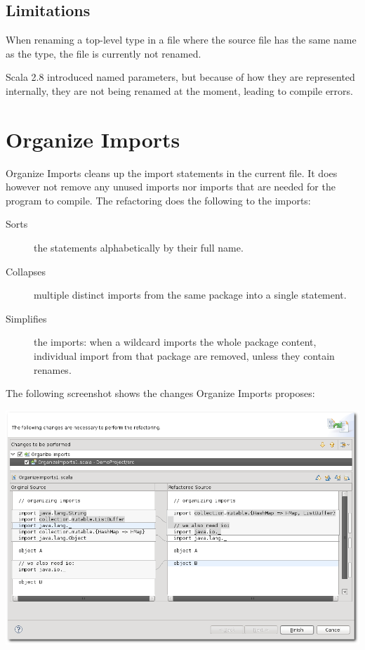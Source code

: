 \documentclass[10pt,a4paper,oneside]{scrreprt}
\begin{document}
\subsection{Limitations}

When renaming a top-level type in a file where the source file has the same name as the type, the file is currently not renamed. 

Scala 2.8 introduced named parameters, but because of how they are represented internally, they are not being renamed at the moment, leading to compile errors.

\section{Organize Imports}

Organize Imports cleans up the import statements in the current file. It does however not remove any unused imports nor imports that are needed for the program to compile. The refactoring does the following to the imports:

\begin{description}
  \item[Sorts] the statements alphabetically by their full name.
  \item[Collapses] multiple distinct imports from the same package into a single statement.
  \item[Simplifies] the imports: when a wildcard imports the whole package content, individual import from that package are removed, unless they contain renames.
\end{description}

The following screenshot shows the changes Organize Imports proposes:

\begin{center}
  \includegraphics[width=\linewidth]{organize_screenshot_1.png}
\end{center}
\end{document}
